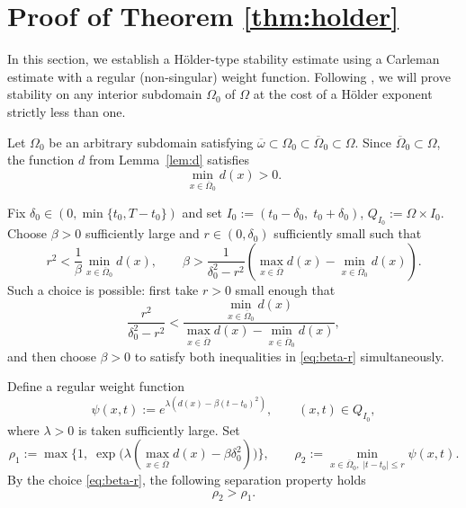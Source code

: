 \documentclass[12pt]{amsart}
\theoremstyle{plain}
\theoremstyle{definition}
\theoremstyle{remark}
\newcommand{\Om}{\Omega}
\begin{document}
\section{Proof of Theorem \ref{thm:holder}}
\label{sec:proof-holder}


In this section, we establish a H\"older-type stability estimate using a
Carleman estimate with a regular (non-singular) weight function.
Following \cite[Chapter~4]{Y25}, we will prove 
stability on any interior subdomain $\Om_0$ of $\Om$ at the cost of a
H\"older exponent strictly less than one.


Let $\Om_0$ be an arbitrary subdomain satisfying
$\overline\omega\subset\Om_0\subset\overline{\Om}_0\subset\Om$.
Since $\overline{\Om}_0\subset\Om$, the function $d$ from Lemma~\ref{lem:d}
satisfies
\[
\min_{x\in\overline{\Om}_0}d(x)>0.
\]

Fix $\delta_0\in(0,\min\{t_0,T-t_0\})$ and set
$I_0:=(t_0-\delta_0,\;t_0+\delta_0)$,
$Q_{I_0}:=\Om\times I_0$.
Choose $\beta>0$ sufficiently large and $r\in(0,\delta_0)$
sufficiently small such that
\begin{equation}\label{eq:beta-r}
r^2<\frac{1}{\beta}\min_{x\in\overline{\Om}_0}d(x),\qquad
\beta>\frac{1}{\delta_0^2-r^2}
\left(\max_{x\in\overline\Om}d(x)
-\min_{x\in\overline{\Om}_0}d(x)\right).
\end{equation}
Such a choice is possible: first take $r>0$ small enough that
\[
\frac{r^2}{\delta_0^2-r^2}
<\frac{\min_{x\in\overline{\Om}_0}d(x)}
{\max_{x\in\overline\Om}d(x)-\min_{x\in\overline{\Om}_0}d(x)},
\]
and then choose $\beta>0$ to satisfy both inequalities in \eqref{eq:beta-r}
simultaneously.

Define a regular weight function
\begin{equation}\label{eq:weights-reg}
\psi(x,t):=e^{\lambda(d(x)-\beta(t-t_0)^2)},
\qquad (x,t)\in Q_{I_0},
\end{equation}
where $\lambda>0$ is taken sufficiently large.
Set
\begin{equation}\label{eq:rho-def}
\rho_1:=\max\bigl\{1,\;
\exp\bigl(\lambda(\max_{x\in\overline\Om}d(x)
-\beta\delta_0^2)\bigr)\bigr\},\qquad
\rho_2:=\min_{x\in\overline{\Om}_0,\;|t-t_0|\le r}\psi(x,t).
\end{equation}
By the choice \eqref{eq:beta-r}, the following separation property holds
\begin{equation}\label{eq:rho-separation}
\rho_2>\rho_1.
\end{equation}
\end{document}
